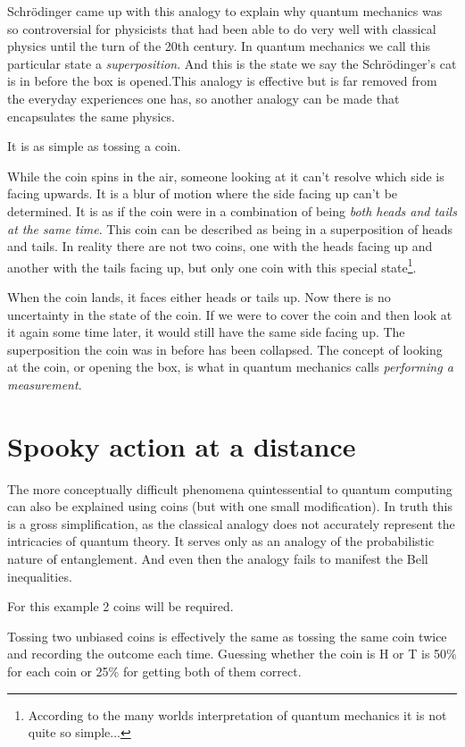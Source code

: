 \documentclass{book}
\begin{document}
Schrödinger came up with this analogy to explain why quantum mechanics was so controversial for physicists that had been able to do very well with classical physics until the turn of the 20th century. In quantum mechanics we call this particular state a \textit{superposition}. And this is the state we say the Schrödinger's cat is in before the box is opened.This analogy is effective but is far removed from the everyday experiences one has, so another analogy can be made that encapsulates the same physics. 

It is as simple as tossing a coin.  

While the coin spins in the air, someone looking at it can't resolve which side is facing upwards. It is a blur of motion where the side facing up can't be determined. It is as if the coin were in a combination of being \textit{both heads and tails at the same time}.  This coin can be described as being in a superposition of heads and tails. In reality there are not two coins, one with the heads facing up and another with the tails facing up, but only one coin with this special state\footnote{According to the many worlds interpretation of quantum mechanics it is not quite so simple...}.

When the coin lands, it faces either heads or tails up. Now there is no uncertainty in the state of the coin. If we were to cover the coin and then look at it again some time later, it would still have the same side facing up. The superposition the coin was in before has been collapsed. The concept of looking at the coin, or opening the box, is what in quantum mechanics calls \textit{performing a measurement}.

\section{Spooky action at a distance}

The more conceptually difficult phenomena quintessential to quantum computing can also be explained using coins (but with one small modification). In truth this is a gross simplification, as the classical analogy does not accurately represent the intricacies of quantum theory. It serves only as an analogy of the probabilistic nature of entanglement. And even then the analogy fails to manifest the Bell inequalities. 

For this example 2 coins will be required. 

Tossing two unbiased coins is effectively the same as tossing the same coin twice and recording the outcome each time. Guessing whether the coin is H or T is 50\% for each coin or 25\% for getting both of them correct. 
\end{document}
